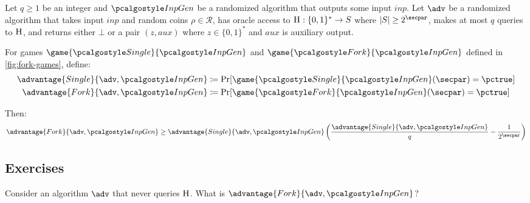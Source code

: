 \begin{lemma}\label{lem:fork}
  Let $q \geq 1$ be an integer and $\algo{InpGen}$ be a randomized algorithm that outputs some input $\mathit{inp}$.
  Let $\adv$ be a randomized algorithm that takes input $\mathit{inp}$ and random coins $\rho \in \mathcal{R}$, has oracle access to ${\normalfont\textsc{H}}: \{0,1\}^* \rightarrow S$ where $|S| \geq 2^\secpar$, makes at most $q$ queries to ${\normalfont\textsc{H}}$, and returns either $\bot$ or a pair $(z, \mathit{aux})$ where $z \in \{0,1\}^*$ and $\mathit{aux}$ is auxiliary output.
  
  For games $\game{\algo{Single}}{\algo{InpGen}}$ and $\game{\algo{Fork}}{\algo{InpGen}}$ defined in \autoref{fig:fork-games}, define:
  \begin{align*}
    \advantage{Single}{\adv, \algo{InpGen}} &\defeq \Pr[\game{\algo{Single}}{\algo{InpGen}}(\secpar) = \pctrue] \\
    \advantage{Fork}{\adv, \algo{InpGen}} &\defeq \Pr[\game{\algo{Fork}}{\algo{InpGen}}(\secpar) = \pctrue]
  \end{align*}
  
  Then:
  \[
  \advantage{Fork}{\adv, \algo{InpGen}} \geq \advantage{Single}{\adv, \algo{InpGen}} \left( \frac{\advantage{Single}{\adv, \algo{InpGen}}}{q} - \frac{1}{2^\secpar} \right)
  \]
\end{lemma}

\subsection{Exercises}

\begin{exercise}
  Consider an algorithm $\adv$ that never queries ${\normalfont\textsc{H}}$. What is $\advantage{Fork}{\adv, \algo{InpGen}}$?
\end{exercise}

